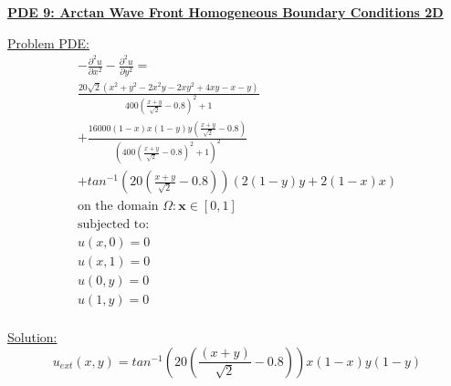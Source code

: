 \documentclass[.\jobname.tex]{subfiles}
\begin{document}
\begin{figure}[H]
	\centering
	\noindent{}
	\label{fig:sol_plot_8}
\end{figure}





\newpage




\underline{\textbf{PDE 9: Arctan Wave Front Homogeneous Boundary Conditions 2D}} 

\underline{Problem PDE:}
\begin{equation}
\label{eq:pde9}
\begin{split}
-\frac{\partial^2 u}{\partial x^2} - \frac{\partial^2 u}{\partial y^2} = \\
\frac{20\sqrt{2}(x^2 + y^2 -2x^2y - 2xy^2 + 4xy - x - y)}{400(\frac{x+y}{\sqrt{2}}-0.8)^2+1} \\
+\frac{16000(1-x)x(1-y)y(\frac{x+y}{\sqrt{2}}-0.8)}{(400(\frac{x+y}{\sqrt{2}}-0.8)^2+1)^2} \\
+ tan^{-1}\left(20\left(\frac{x+y}{\sqrt{2}}-0.8\right)\right)(2(1-y)y + 2(1-x)x)  \\
\text{on the domain } \Omega: \mathbf{x} \in [0,1] \\
\text{subjected to: } \\
u(x,0) = 0 \\
u(x,1) = 0 \\
u(0,y) = 0 \\
u(1,y) = 0 \\
\end{split}
\end{equation}


\underline{Solution:}
\begin{equation}
\label{eq:sol9}
u_{ext}(x,y) = tan^{-1}\left(20\left(\frac{(x + y)}{\sqrt{2}} -0.8\right)\right)x(1-x)y(1-y)
\end{equation}
\end{document}
